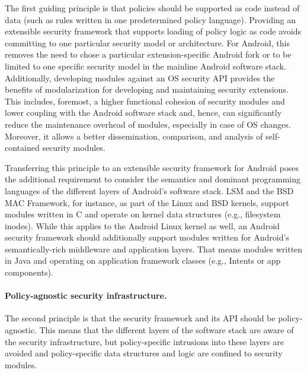 \documentclass[letterpaper,twocolumn,10pt]{article}
\begin{document}
The first guiding principle is that policies should be supported as code instead of data (such as rules written in one predetermined policy language). Providing an extensible security framework that supports loading of policy logic as code avoids committing to one particular security model or architecture. For Android, this removes the need to chose a particular extension-specific Android fork or to be limited to one specific security model in the mainline Android software stack. Additionally, developing modules against an OS security API provides the benefits of modularization for developing and maintaining security extensions. This includes, foremost, a higher functional cohesion of security modules and lower coupling with the Android software stack and, hence, can significantly reduce the maintenance overhead of modules, especially in case of OS changes. Moreover, it allows a better dissemination, comparison, and analysis of self-contained security modules.

Transferring this principle to an extensible security framework for Android poses the additional requirement to consider the semantics and dominant programming languages of the different layers of Android's software stack. LSM and the BSD MAC Framework, for instance, as part of the Linux and BSD kernels, support modules written in C and operate on kernel data structures (e.g., filesystem inodes). While this applies to the Android Linux kernel as well, an Android security framework should additionally support modules written for Android's semantically-rich middleware and application layers. That means modules written in Java and operating on application framework classes (e.g., Intents or app components).

\paragraph{Policy-agnostic security infrastructure.}

The second principle is that the security framework and its API should be policy-agnostic. This means that the different layers of the software stack are aware of the security infrastructure, but policy-specific intrusions into these layers are avoided and policy-specific data structures and logic are confined to security modules.
\end{document}
